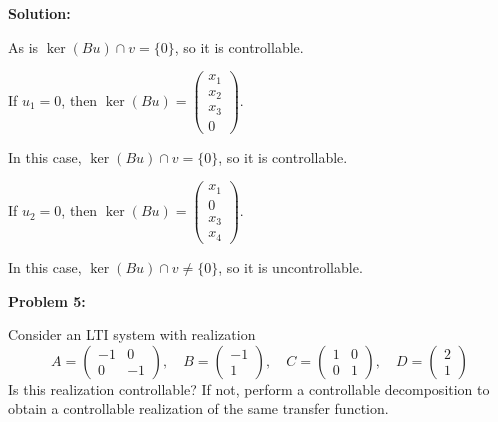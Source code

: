 \documentclass[12pt]{article}
\newenvironment{problem}[1]{
    \textbf{Problem #1:}
}{
    \rmfamily \vspace{1em}
}
\newenvironment{solution}{
    \textbf{Solution:}
    
}{
    
    \vspace{2em}
}
\begin{document}
\begin{solution}
\begin{enumerate}[label=(\alph*)]
        As is \(\ker(Bu) \cap v = \{0\}\), so it is controllable.

        If \(u_1 = 0\), then \(\ker(Bu) = \begin{pmatrix}
            x_1\\
            x_2\\
            x_3\\
            0
        \end{pmatrix}\).

        In this case, \(\ker(Bu) \cap v = \{0\}\), so it is controllable.

        If \(u_2 = 0\), then \(\ker(Bu) = \begin{pmatrix}
            x_1\\
            0\\
            x_3\\
            x_4
        \end{pmatrix}\).

        In this case, \(\ker(Bu) \cap v \neq \{0\}\), so it is uncontrollable.
    \end{enumerate}
\end{solution}

\newpage

\begin{problem}{5}
    Consider an LTI system with realization
    \[
        A = \begin{pmatrix}
            -1 & 0\\
            0 & -1
        \end{pmatrix}, \quad
        B = \begin{pmatrix}
            -1\\
            1
        \end{pmatrix}, \quad
        C = \begin{pmatrix}
            1 & 0\\
            0 & 1
        \end{pmatrix}, \quad
        D = \begin{pmatrix}
            2\\
            1
        \end{pmatrix}
    \]
    Is this realization controllable? If not, perform a controllable decomposition to obtain a controllable realization of the same transfer function.
\end{problem}
\end{document}
